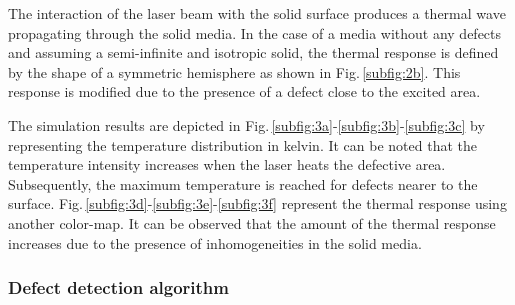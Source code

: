 \documentclass[12pt]{spieman}
\begin{document}
\begin{spacing}{2}
  


The interaction of the laser beam with the solid surface produces a thermal wave propagating through the solid media. In the case of a media without any defects and assuming a semi-infinite and isotropic solid, the thermal response is defined by the shape of a symmetric hemisphere\cite{Li2011} as shown in Fig.\,\ref{subfig:2b}. This response is modified due to the presence of a defect close to the excited area.

The simulation results are depicted in Fig.\,\ref{subfig:3a}-\ref{subfig:3b}-\ref{subfig:3c} by representing the temperature distribution in kelvin. It can be noted that the temperature intensity increases when the laser heats the defective area. Subsequently, the maximum temperature is reached for defects nearer to the surface. Fig.\,\ref{subfig:3d}-\ref{subfig:3e}-\ref{subfig:3f} represent the thermal response using another color-map. It can be observed that the amount of the thermal response increases due to the presence of inhomogeneities in the solid media.
	
\subsubsection{Defect detection algorithm}\label{subsec:312}


\end{spacing}
\end{document}
